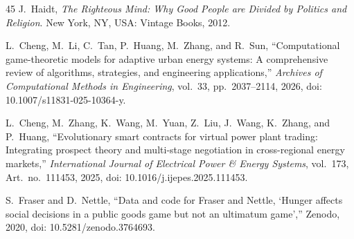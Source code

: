 \documentclass[journal]{IEEEtran}
\begin{document}
\begin{thebibliography}{45}
J.~Haidt, \emph{The Righteous Mind: Why Good People are Divided by Politics and Religion}.
New York, NY, USA: Vintage Books, 2012.


L.~Cheng, M.~Li, C.~Tan, P.~Huang, M.~Zhang, and R.~Sun, ``Computational game-theoretic models for adaptive urban energy systems: A comprehensive review of algorithms, strategies, and engineering applications,''
\emph{Archives of Computational Methods in Engineering}, vol.~33, pp.~2037--2114, 2026, doi: 10.1007/s11831-025-10364-y.

L.~Cheng, M.~Zhang, K.~Wang, M.~Yuan, Z.~Liu, J.~Wang, K.~Zhang, and P.~Huang, ``Evolutionary smart contracts for virtual power plant trading: Integrating prospect theory and multi-stage negotiation in cross-regional energy markets,''
\emph{International Journal of Electrical Power \& Energy Systems}, vol.~173, Art.~no.~111453, 2025, doi: 10.1016/j.ijepes.2025.111453.

S.~Fraser and D.~Nettle, ``Data and code for Fraser and Nettle, `Hunger affects social decisions in a public goods game but not an ultimatum game',''
Zenodo, 2020, doi: 10.5281/zenodo.3764693.

\end{thebibliography}

\balance
\end{document}
